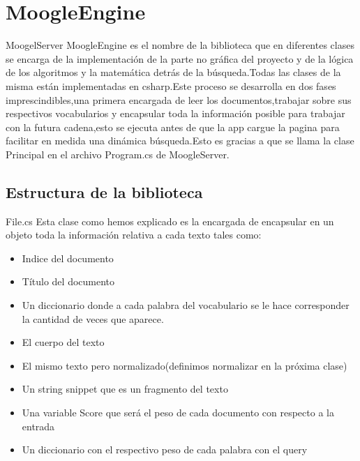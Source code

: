 \section{MoogleEngine}
\begin{block}{MoogelServer}
  MoogleEngine es el nombre de la biblioteca que en diferentes clases se
encarga de la implementación de la parte no gr\'afica del proyecto y de la lógica
de los algoritmos y la matemática detrás de la búsqueda.Todas las clases de
la misma están implementadas en csharp.Este proceso se desarrolla en dos fases
imprescindibles,una primera encargada de leer los documentos,trabajar sobre
sus respectivos vocabularios y encapsular  toda la información posible para
trabajar con la futura cadena,esto se ejecuta antes de que la app  cargue la
pagina para facilitar en medida una dinámica búsqueda.Esto es gracias a que
se llama la clase Principal en el archivo Program.cs de MoogleServer.

\end{block}

\subsection{Estructura de la biblioteca}
\begin{frame}[fragile]{File.cs}
  Esta clase como hemos explicado es la encargada de encapsular en un objeto
  toda la información relativa a cada texto tales como:
  \begin{itemize}
      \item Indice del documento
      \item T\'itulo del documento
      \item Un diccionario donde a cada palabra del vocabulario se le hace corresponder la
      cantidad de veces que aparece.
      \item El cuerpo del texto
      \item El  mismo texto pero normalizado(definimos normalizar en la próxima clase)
      \item Un string snippet  que es un fragmento del texto
      \item Una variable Score que será el peso de cada documento con respecto a la
      entrada
      \item Un diccionario con el respectivo peso de cada  palabra con el query
      
  \end{itemize}

\end{frame}

